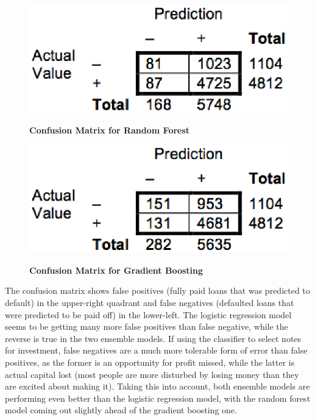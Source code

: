 \begin{figure}[!h]
    \centering
    \includegraphics[scale=0.5]{figs/rf_conf.eps}
    \label{table:rf_conf}
    \caption{\textbf{Confusion Matrix for Random Forest}}
\end{figure}

\begin{figure}[!h]
    \centering
    \includegraphics[scale=0.5]{figs/gb_conf.eps}
    \label{table:gb_conf}
    \caption{\textbf{Confusion Matrix for Gradient Boosting}}
\end{figure}

The confusion matrix shows false positives (fully paid loans that was predicted to default) in the upper-right quadrant and false 
negatives (defaulted loans that were predicted to be paid off) in the lower-left. The logistic regression model seems to 
be getting many more false positives than false negative, while the reverse is true in the two ensemble models. 
If using the classifier to select notes for investment, false negatives are a much more tolerable form of error than false
positives, as the former is an opportunity for profit missed, while the latter is actual capital lost (most people are more
disturbed by losing money than they are excited about making it). Taking this into account, both ensemble models are performing
even better than the logistic regression model, with the random forest model coming out slightly ahead of the gradient boosting 
one.

